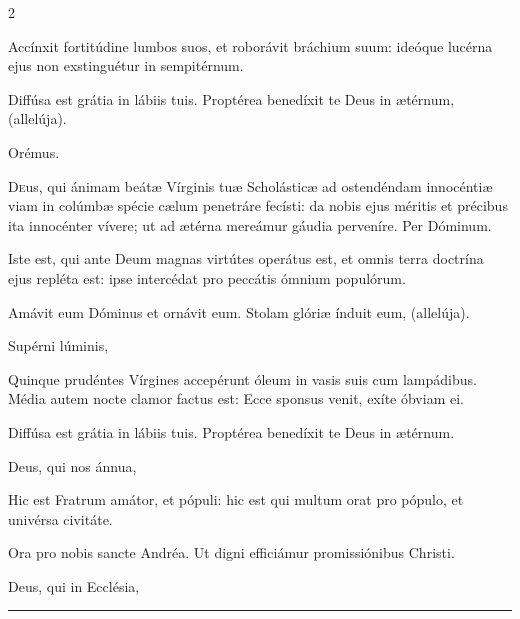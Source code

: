 \documentclass[9pt,twoside]{extarticle}
\begin{document}
\begin{multicols}{2}
\begin{tightlist}{}
\item {} Accínxit fortitúdine lumbos suos, et roborávit bráchium suum: ideóque lucérna ejus non exstinguétur in sempitérnum.
\item {} Diffúsa est grátia in lábiis tuis.  Proptérea benedíxit te Deus in ætérnum, (allelúja).
\item Orémus. \hfill {}
\end{tightlist}
\lettrine{D}eus, qui ánimam beátæ Vírginis tuæ Scholásticæ ad ostendéndam innocéntiæ viam in colúmbæ spécie cælum penetráre fecísti: da nobis ejus méritis et précibus ita innocénter vívere; ut ad ætérna mereámur gáudia perveníre. Per Dóminum.

\begin{tightlist}{}
\item {} Iste est, qui ante Deum magnas virtútes operátus est, et omnis terra doctrína ejus repléta est: ipse intercédat pro peccátis ómnium populórum.
\item {} Amávit eum Dóminus et ornávit eum.  Stolam glóriæ índuit eum, (allelúja).
\item {} Supérni lúminis, 
\item {} Quinque prudéntes Vírgines accepérunt óleum in vasis suis cum lampádibus. Média autem nocte clamor factus est: Ecce sponsus venit, exíte óbviam ei.
\item {} Diffúsa est grátia in lábiis tuis.  Proptérea benedíxit te Deus in ætérnum.
\item {} Deus, qui nos ánnua, 
\item {} Hic est Fratrum amátor, et pópuli: hic est qui multum orat pro pópulo, et univérsa civitáte.
\item {} Ora pro nobis sancte Andréa.  Ut digni efficiámur promissiónibus Christi.
\item {} Deus, qui in Ecclésia, 
\item {}
\end{tightlist}


\begin{center}\textcolor{red}{\rule{\linewidth}{0.5pt}} \end{center}


\end{multicols}
\end{document}
